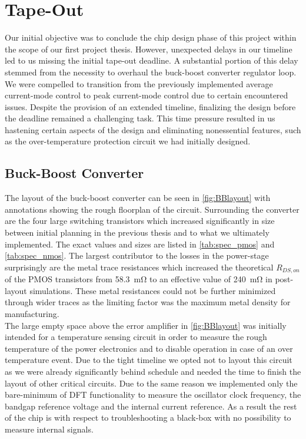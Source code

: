 \section{Tape-Out}
\label{sec:tapout}
Our initial objective was to conclude the chip design phase of this project within the scope of our first project thesis. However, unexpected delays in our timeline led to us missing the initial tape-out deadline. A substantial portion of this delay stemmed from the necessity to overhaul the buck-boost converter regulator loop. We were compelled to transition from the previously implemented average current-mode control to peak current-mode control due to certain encountered issues. Despite the provision of an extended timeline, finalizing the design before the deadline remained a challenging task. This time pressure resulted in us hastening certain aspects of the design and eliminating nonessential features, such as the over-temperature protection circuit we had initially designed.

\subsection{Buck-Boost Converter}
The layout of the buck-boost converter can be seen in  \autoref{fig:BBlayout} with annotations showing the rough floorplan of the circuit. Surrounding the converter are the four large switching transistors which increased significantly in size between initial planning in the previous thesis and to what we ultimately implemented. The exact values and sizes are listed in \autoref{tab:spec_pmos} and \autoref{tab:spec_nmos}. The largest contributor to the losses in the power-stage surprisingly are the metal trace resistances which increased the theoretical $R_{DS,on}$ of the \ac{PMOS} transistors from \qty{58.3}{\milli\ohm} to an effective value of \qty{240}{\milli\ohm} in post-layout simulations. These metal resistances could not be further minimized through wider traces as the limiting factor was the maximum metal density for manufacturing. \\
The large empty space above the error amplifier in \autoref{fig:BBlayout} was initially intended for a temperature sensing circuit in order to measure the rough temperature of the power electronics and to disable operation in case of an over temperature event. Due to the tight timeline we opted not to layout this circuit as we were already significantly behind schedule and needed the time to finish the layout of other critical circuits. Due to the same reason we implemented only the bare-minimum of \ac{DFT} functionality to measure the oscillator clock frequency, the bandgap reference voltage and the internal current reference. As a result the rest of the chip is with respect to troubleshooting a black-box with no possibility to measure internal signals.

